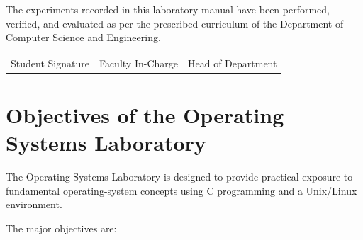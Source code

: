 \documentclass[12pt,a4paper]{report}
\begin{document}
The experiments recorded in this laboratory manual have been performed,
verified, and evaluated as per the prescribed curriculum of the Department
of Computer Science and Engineering.

\vspace{2cm}

\begin{tabularx}{\textwidth}{X X X}
\centering Student Signature &
\centering Faculty In-Charge &
\centering\arraybackslash Head of Department
\end{tabularx}


\chapter*{Objectives of the Operating Systems Laboratory}

The Operating Systems Laboratory is designed to provide practical exposure
to fundamental operating-system concepts using C programming and a
Unix/Linux environment.

The major objectives are:
\end{document}
